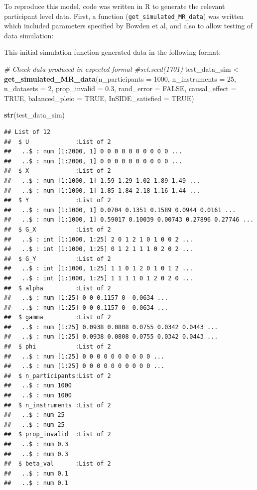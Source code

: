 \documentclass[
]{article}
\newenvironment{Shaded}{\begin{snugshade}}{\end{snugshade}}
\newcommand{\AttributeTok}[1]{\textcolor[rgb]{0.13,0.29,0.53}{#1}}
\newcommand{\CommentTok}[1]{\textcolor[rgb]{0.56,0.35,0.01}{\textit{#1}}}
\newcommand{\ConstantTok}[1]{\textcolor[rgb]{0.56,0.35,0.01}{#1}}
\newcommand{\DecValTok}[1]{\textcolor[rgb]{0.00,0.00,0.81}{#1}}
\newcommand{\FloatTok}[1]{\textcolor[rgb]{0.00,0.00,0.81}{#1}}
\newcommand{\FunctionTok}[1]{\textcolor[rgb]{0.13,0.29,0.53}{\textbf{#1}}}
\newcommand{\NormalTok}[1]{#1}
\newcommand{\OtherTok}[1]{\textcolor[rgb]{0.56,0.35,0.01}{#1}}
\begin{document}
To reproduce this model, code was written in R to generate the relevant participant level data. First, a function (\texttt{get\_simulated\_MR\_data}) was written which included parameters specified by Bowden et al, and also to allow testing of data simulation:

This initial simulation function generated data in the following format:

\begin{Shaded}
\begin{Highlighting}[]
\CommentTok{\# Check data produced in expected format}
\CommentTok{\#set.seed(1701)}
\NormalTok{test\_data\_sim }\OtherTok{\textless{}{-}} \FunctionTok{get\_simulated\_MR\_data}\NormalTok{(}\AttributeTok{n\_participants =} \DecValTok{1000}\NormalTok{,}
                                       \AttributeTok{n\_instruments =} \DecValTok{25}\NormalTok{,}
                                       \AttributeTok{n\_datasets =} \DecValTok{2}\NormalTok{,}
                                       \AttributeTok{prop\_invalid =} \FloatTok{0.3}\NormalTok{,}
                                       \AttributeTok{rand\_error =} \ConstantTok{FALSE}\NormalTok{,}
                                       \AttributeTok{causal\_effect =} \ConstantTok{TRUE}\NormalTok{,}
                                       \AttributeTok{balanced\_pleio =} \ConstantTok{TRUE}\NormalTok{,}
                                       \AttributeTok{InSIDE\_satisfied =} \ConstantTok{TRUE}\NormalTok{)}

\FunctionTok{str}\NormalTok{(test\_data\_sim)}
\end{Highlighting}
\end{Shaded}

\begin{verbatim}
## List of 12
##  $ U             :List of 2
##   ..$ : num [1:2000, 1] 0 0 0 0 0 0 0 0 0 0 ...
##   ..$ : num [1:2000, 1] 0 0 0 0 0 0 0 0 0 0 ...
##  $ X             :List of 2
##   ..$ : num [1:1000, 1] 1.59 1.29 1.02 1.89 1.49 ...
##   ..$ : num [1:1000, 1] 1.85 1.84 2.18 1.16 1.44 ...
##  $ Y             :List of 2
##   ..$ : num [1:1000, 1] 0.0704 0.1351 0.1589 0.0944 0.0161 ...
##   ..$ : num [1:1000, 1] 0.59017 0.10039 0.00743 0.27896 0.27746 ...
##  $ G_X           :List of 2
##   ..$ : int [1:1000, 1:25] 2 0 1 2 1 0 1 0 0 2 ...
##   ..$ : int [1:1000, 1:25] 0 1 2 1 1 1 0 2 0 2 ...
##  $ G_Y           :List of 2
##   ..$ : int [1:1000, 1:25] 1 1 0 1 2 0 1 0 1 2 ...
##   ..$ : int [1:1000, 1:25] 1 1 1 1 0 1 2 0 2 0 ...
##  $ alpha         :List of 2
##   ..$ : num [1:25] 0 0 0.1157 0 -0.0634 ...
##   ..$ : num [1:25] 0 0 0.1157 0 -0.0634 ...
##  $ gamma         :List of 2
##   ..$ : num [1:25] 0.0938 0.0808 0.0755 0.0342 0.0443 ...
##   ..$ : num [1:25] 0.0938 0.0808 0.0755 0.0342 0.0443 ...
##  $ phi           :List of 2
##   ..$ : num [1:25] 0 0 0 0 0 0 0 0 0 0 ...
##   ..$ : num [1:25] 0 0 0 0 0 0 0 0 0 0 ...
##  $ n_participants:List of 2
##   ..$ : num 1000
##   ..$ : num 1000
##  $ n_instruments :List of 2
##   ..$ : num 25
##   ..$ : num 25
##  $ prop_invalid  :List of 2
##   ..$ : num 0.3
##   ..$ : num 0.3
##  $ beta_val      :List of 2
##   ..$ : num 0.1
##   ..$ : num 0.1
\end{verbatim}
\end{document}
